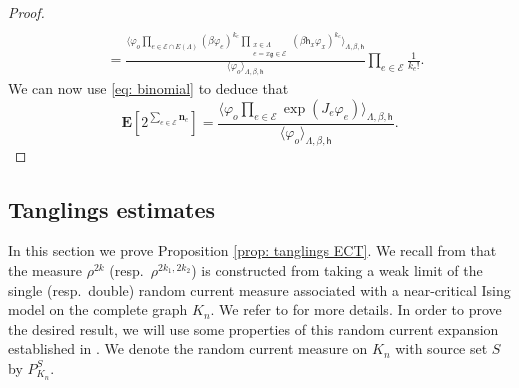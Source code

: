 \documentclass[11pt,a4paper]{article}
\theoremstyle{definition}
\numberwithin{equation}{section}
\newcommand\n{\mathbf{n}}
\newcommand\fg{\mathfrak{g}}
\begin{document}
\begin{proof}
\begin{equation}
\begin{aligned}
    \\&=
    \frac{\langle \varphi_o\prod_{e\in \mathcal{E}\cap E(\Lambda)}(\beta\varphi_e)^{k_e}\prod_{\substack{x\in \Lambda\\e=x\fg\in \mathcal{E}}}(\beta \mathsf{h}_x\varphi_x)^{k_e}\rangle_{\Lambda,\beta,\mathsf{h}}}{\langle \varphi_o\rangle_{\Lambda,\beta,\mathsf{h}}}\prod_{e\in \mathcal{E}}\frac{1}{k_e!}.
\end{aligned}    
\end{equation}
We can now use \eqref{eq: binomial} to deduce that 
\begin{equation}
    \mathbf{E}\left[2^{\sum_{e\in \mathcal{E}}\n_e}\right]=
    \frac{\langle \varphi_o\prod_{e\in \mathcal{E}}\exp(J_e\varphi_e)\rangle_{\Lambda,\beta,\mathsf{h}}}{\langle \varphi_o\rangle_{\Lambda,\beta,\mathsf{h}}}.
\end{equation}
\end{proof}


\subsection{Tanglings estimates}\label{appendix:strict stochastic dom tanglings}

In this section we prove Proposition \ref{prop: tanglings ECT}.
We recall from \cite{GunaratnamPanagiotisPanisSeveroPhi42022} that the measure $\rho^{2k}$ (resp.\ $\rho^{2k_1,2k_2}$) is constructed from taking a weak limit of the single (resp.\ double) random current measure associated with a near-critical Ising model on the complete graph $K_n$. We refer to \cite{GunaratnamPanagiotisPanisSeveroPhi42022,KPP24} for more details. In order to prove the desired result, we will use some properties of this random current expansion established in \cite{KPP24}. We denote the random current measure on $K_n$ with source set $S$ by $P^S_{K_n}$.
\end{document}
